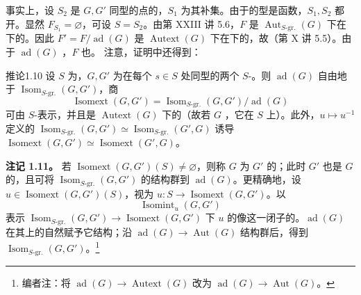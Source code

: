事实上，设 $S_2$ 是 $G,G'$ 同型的点的，$S_1$ 为其补集。由于的型是函数，$S_1,S_2$ 都开。显然 $F_{S_1}=\varnothing$，可设 $S=S_2$。由第 XXIII 讲 5.6，$F$ 是 $\operatorname{Aut}_{S\text{-gr.}}(G)$ 下在下的。因此 $F'=F/\operatorname{ad}(G)$ 是 $\operatorname{Autext}(G)$ 下在下的，故（第 X 讲 5.5）。由于 $\operatorname{ad}(G)$ ，$F$ 也。
注意，证明中还得到：
\begin{SGAresult}{推论}{1.10}
设 $S$ 为，$G,G'$ 为在每个 $s\in S$ 处同型的两个 $S$-。则 $\operatorname{ad}(G)$ 自由地于 $\operatorname{Isom}_{S\text{-gr.}}(G,G')$，商
\[\operatorname{Isomext}(G,G')=\operatorname{Isom}_{S\text{-gr.}}(G,G')/\operatorname{ad}(G)\]
可由 $S$-表示，并且是 $\operatorname{Autext}(G)$ 下的（故若 $G$ ，它在 $S$ 上）。此外，$u\mapsto u^{-1}$ 定义的 $\operatorname{Isom}_{S\text{-gr.}}(G,G')\simeq\operatorname{Isom}_{S\text{-gr.}}(G',G)$ 诱导 $\operatorname{Isomext}(G,G')\simeq\operatorname{Isomext}(G',G)$。
\end{SGAresult}
\textbf{注记 1.11。} 若 $\operatorname{Isomext}(G,G')(S)\ne\varnothing$，则称 $G$ 为 $G'$ 的；此时 $G'$ 也是 $G$ 的，且可将 $\operatorname{Isom}_{S\text{-gr.}}(G,G')$ 的结构群到 $\operatorname{ad}(G)$。更精确地，设 $u\in\operatorname{Isomext}(G,G')(S)$，视为 $u:S\to\operatorname{Isomext}(G,G')$。以
\[\operatorname{Isomint}_u(G,G')\]
表示 $\operatorname{Isom}_{S\text{-gr.}}(G,G')\to\operatorname{Isomext}(G,G')$ 下 $u$ 的像这一闭子的。$\operatorname{ad}(G)$ 在其上的自然赋予它结构；沿 $\operatorname{ad}(G)\to\operatorname{Aut}(G)$ 结构群后，得到 $\operatorname{Isom}_{S\text{-gr.}}(G,G')$。\footnote[5]{编者注：将 $\operatorname{ad}(G)\to\operatorname{Autext}(G)$ 改为 $\operatorname{ad}(G)\to\operatorname{Aut}(G)$。}
